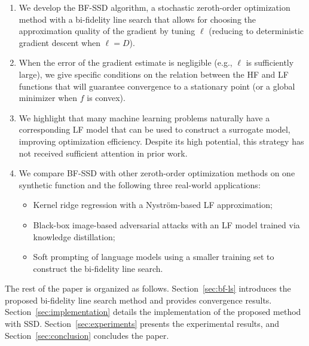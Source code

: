 \documentclass[10pt]{article} %
\numberwithin{equation}{section}
\theoremstyle{plain}
\theoremstyle{definition}
\newcommand{\<}{\langle}
\renewcommand{\>}{\rangle}
\renewcommand{\(}{\left(}
\renewcommand{\)}{\right)}
\renewcommand{\[}{\left[}
\renewcommand{\]}{\right]}
\begin{document}
\begin{enumerate}
    \item We develop the BF-SSD algorithm, a stochastic zeroth-order optimization method with a bi-fidelity line search that allows for choosing the approximation quality of the gradient by tuning $\ell$ (reducing to deterministic gradient descent when $\ell=D$).
    \item When the error of the gradient estimate is negligible (e.g., $\ell$ is sufficiently large), we give specific conditions on the relation between the HF and LF functions that will guarantee convergence to a stationary point (or a global minimizer when $f$ is convex).
    \item We highlight that many machine learning problems naturally have a corresponding LF model that can be used to construct a surrogate model, improving optimization efficiency. Despite its high potential, this strategy has not received sufficient attention in prior work.
    \item We compare BF-SSD with other zeroth-order optimization methods on one synthetic function and the following three real-world applications:
    \begin{itemize}
        \item Kernel ridge regression with a Nystr\"om-based LF approximation;
        \item Black-box image-based adversarial attacks with an LF model trained via knowledge distillation;
        \item Soft prompting of language models using a smaller training set to construct the bi-fidelity line search.
    \end{itemize}
\end{enumerate}


The rest of the paper is organized as follows. Section~\ref{sec:bf-ls} introduces the proposed bi-fidelity line search method and provides convergence results. Section~\ref{sec:implementation} details the implementation of the proposed method with SSD. Section~\ref{sec:experiments} presents the experimental results, and Section~\ref{sec:conclusion} concludes the paper.

    
\end{document}
